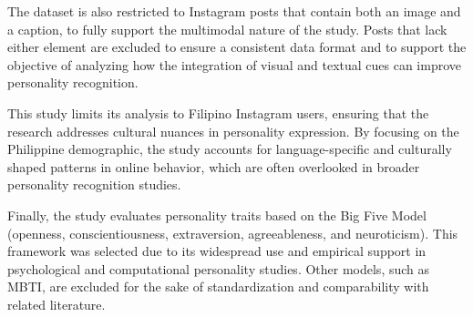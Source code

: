 	The dataset is also restricted to Instagram posts that contain both an image and a caption, to fully support the multimodal nature of the study. Posts that lack either element are excluded to ensure a consistent data format and to support the objective of analyzing how the integration of visual and textual cues can improve personality recognition.
	
	This study limits its analysis to Filipino Instagram users, ensuring that the research addresses cultural nuances in personality expression. By focusing on the Philippine demographic, the study accounts for language-specific and culturally shaped patterns in online behavior, which are often overlooked in broader personality recognition studies.
	
	Finally, the study evaluates personality traits based on the Big Five Model (openness, conscientiousness, extraversion, agreeableness, and neuroticism). This framework was selected due to its widespread use and empirical support in psychological and computational personality studies. Other models, such as MBTI, are excluded for the sake of standardization and comparability with related literature.







